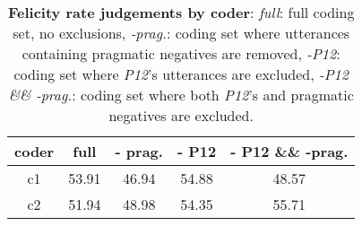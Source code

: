 \begin{screenonly}
\begin{table}[h]
  \caption{\textbf{Felicity rate judgements by coder}: \emph{full}: full coding set, no exclusions, \emph{-prag.}: coding set where utterances containing pragmatic
    negatives are removed, \emph{-P12}: coding set where \emph{P12}'s utterances are excluded, \emph{-P12 \&\& -prag.}: coding set where both \emph{P12}'s and
    pragmatic negatives are excluded.}
  \label{tbl:coder_felicity}
  \setlength{\tabcolsep}{2.325ex}
  \begin{tabular}{ccccc}
    \toprule
    coder & full & - prag. & - P12 & - P12 \&\& -prag. \\
    \midrule
    c1 & 53.91 & 46.94 & 54.88 & 48.57 \\
    c2 & 51.94 & 48.98 & 54.35 & 55.71 \\
    \bottomrule
  \end{tabular}
\end{table}
\NewCoffin \AccuFelTable
\NewCoffin \AccuFelTableR
\NewCoffin \AccuFelTableP
\begin{table*}[h] \setlength{\tabcolsep}{0.35ex}
  \caption{\textbf{Accumulated frequencies for robot negation types and their felicity}. Displayed are the accumulated frequencies of the various negation
    types the robot engaged in across sessions and their felicities. The following abbreviations are used for the negation types: \emph{TD}: truth-func. denial,
    \emph{MD}: mot.-dep. denial, \emph{A}: neg. agreement, \emph{R}: rejection, \emph{I}: neg. imperative, \emph{E}: mot. dep. exclamation, \emph{SP}:
    self-prohibition, \emph{PD}: perspective-dependent denial. See the SI coding scheme for a description of each type including examples.}
  \label{tbl:accu_felicity}
  \SetHorizontalCoffin {}
\end{table*}
\end{screenonly}
